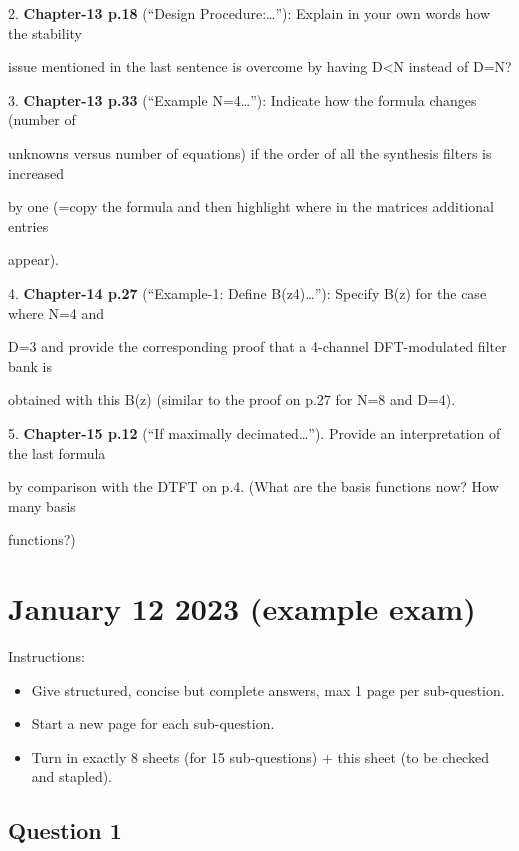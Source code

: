 \documentclass[
  a4paper,
  ,captions=tableheading
]{scrartcl}
\providecommand{\tightlist}{%
  \setlength{\itemsep}{0pt}\setlength{\parskip}{0pt}}
\begin{document}
2. \textbf{Chapter-13 p.18} (``Design Procedure:\ldots''): Explain in
your own words how the stability

issue mentioned in the last sentence is overcome by having D\textless N
instead of D=N?

3. \textbf{Chapter-13 p.33} (``Example N=4\ldots''): Indicate how the
formula changes (number of

unknowns versus number of equations) if the order of all the synthesis
filters is increased

by one (=copy the formula and then highlight where in the matrices
additional entries

appear).

4. \textbf{Chapter-14 p.27} (``Example-1: Define B(z4)\ldots''): Specify
B(z) for the case where N=4 and

D=3 and provide the corresponding proof that a 4-channel DFT-modulated
filter bank is

obtained with this B(z) (similar to the proof on p.27 for N=8 and D=4).

5. \textbf{Chapter-15 p.12} (``If maximally decimated\ldots''). Provide
an interpretation of the last formula

by comparison with the DTFT on p.4. (What are the basis functions now?
How many basis

functions?)

\section{\texorpdfstring{\textbf{January 12 2023 (example
exam)}}{January 12 2023 (example exam)}}\label{january-12-2023-example-exam}

Instructions:

\begin{itemize}
\tightlist
\item
  Give structured, concise but complete answers, max 1 page per
  sub-question.\\
\item
  Start a new page for each sub-question.\\
\item
  Turn in exactly 8 sheets (for 15 sub-questions) + this sheet (to be
  checked and stapled).
\end{itemize}

\subsection{\texorpdfstring{\textbf{Question
1}}{Question 1}}\label{question-1}
\end{document}
